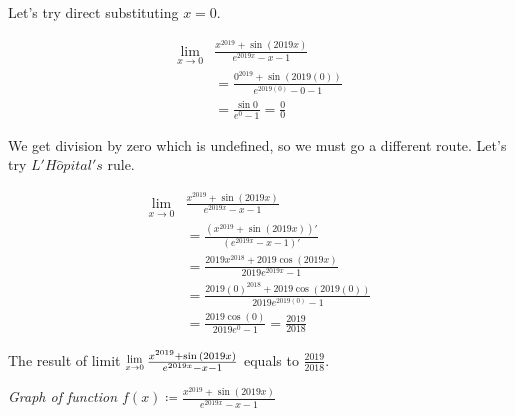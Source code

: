 Let's try direct substituting $x = 0$.

\begin{align}
    \lim_{x \rightarrow 0}&\frac{x^{2019} + \sin{(2019x)}}{e^{2019x} - x - 1} \\
    &= \frac{0^{2019} + \sin{(2019(0))}}{e^{2019(0)} - 0 - 1} \\
    &= \frac{\sin{0}}{e^{0} - 1} = \frac{0}{0}
\end{align}

We get division by zero which is undefined, so we must go
a different route. Let's try $L'H\hat{o}pital's$ rule.

 \begin{align}
    \lim_{x \rightarrow 0}&
    \frac{x^{2019} + \sin{(2019x)}}{e^{2019x} - x - 1} \\
    &=\frac{(x^{2019} + \sin{(2019x)})'}{(e^{2019x} - x - 1)'} \\
    &=\frac{2019x^{2018} + 2019\cos{(2019x)}}{2019e^{2019x} - 1} \\
    &=\frac{2019(0)^{2018} + 2019\cos{(2019(0))}}{2019e^{2019(0)} - 1} \\
    &=\frac{2019\cos{(0)}}{2019e^{0} - 1} =\frac{2019}{2018}
\end{align}

The result of limit $\Lim{x \rightarrow 0} \frac{x^{2019} + \sin{(2019x)}}
{e^{2019x} - x - 1}$ equals to $\frac{2019}{2018}$. 

\begin{center}
    \textit{Graph of function $f(x) \coloneq 
    \frac{x^{2019} + \sin{(2019x)}}{e^{2019x} - x - 1}$}

\end{center}
